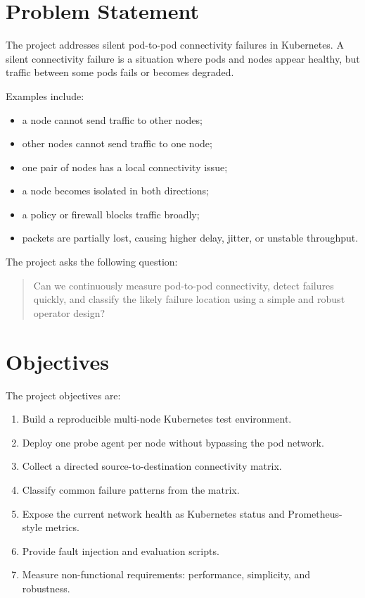 \documentclass[11pt,a4paper]{article}
\begin{document}
\section{Problem Statement}

The project addresses silent pod-to-pod connectivity failures in Kubernetes. A silent connectivity failure is a situation where pods and nodes appear healthy, but traffic between some pods fails or becomes degraded.

Examples include:

\begin{itemize}
  \item a node cannot send traffic to other nodes;
  \item other nodes cannot send traffic to one node;
  \item one pair of nodes has a local connectivity issue;
  \item a node becomes isolated in both directions;
  \item a policy or firewall blocks traffic broadly;
  \item packets are partially lost, causing higher delay, jitter, or unstable throughput.
\end{itemize}

The project asks the following question:

\begin{quote}
Can we continuously measure pod-to-pod connectivity, detect failures quickly, and classify the likely failure location using a simple and robust operator design?
\end{quote}

\section{Objectives}

The project objectives are:

\begin{enumerate}
  \item Build a reproducible multi-node Kubernetes test environment.
  \item Deploy one probe agent per node without bypassing the pod network.
  \item Collect a directed source-to-destination connectivity matrix.
  \item Classify common failure patterns from the matrix.
  \item Expose the current network health as Kubernetes status and Prometheus-style metrics.
  \item Provide fault injection and evaluation scripts.
  \item Measure non-functional requirements: performance, simplicity, and robustness.
\end{enumerate}
\end{document}
